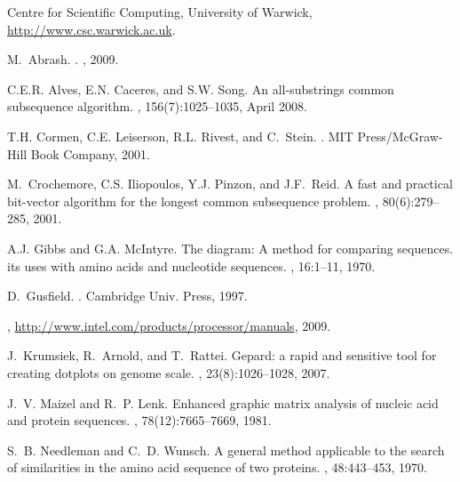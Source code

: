 \documentclass{IOS-Book-Article}     \usepackage{amsmath}
\theoremstyle{plain}
\theoremstyle{definition}
\begin{document}
{
\begin{thebibliography}{10}

{Centre for Scientific Computing, University of Warwick,
  \url{http://www.csc.warwick.ac.uk}}.

M.~Abrash.
.
, 2009.

C.E.R. Alves, E.N. Caceres, and S.W. Song.
\newblock An all-substrings common subsequence algorithm.
, 156(7):1025--1035, April 2008.

T.H. Cormen, C.E. Leiserson, R.L. Rivest, and C.~Stein.
.
\newblock MIT Press/McGraw-Hill Book Company, 2001.

M.~Crochemore, C.S. Iliopoulos, Y.J. Pinzon, and J.F.~Reid.
\newblock A fast and practical bit-vector algorithm for the longest common
  subsequence problem.
, 80(6):279--285, 2001.

A.J. Gibbs and G.A. McIntyre.
\newblock The diagram: {A} method for comparing sequences. its uses with amino
  acids and nucleotide sequences.
, 16:1--11, 1970.

D.~Gusfield.
.
\newblock Cambridge Univ. Press, 1997.

, 
\newblock \url{http://www.intel.com/products/processor/manuals}, 2009.

J.~Krumsiek, R.~Arnold, and T.~Rattei.
\newblock Gepard: a rapid and sensitive tool for creating dotplots on genome
  scale.
, 23(8):1026--1028, 2007.

J.~V. Maizel and R.~P. Lenk.
\newblock Enhanced graphic matrix analysis of nucleic acid and protein
  sequences.
, 78(12):7665--7669,
  1981.

S.~B. Needleman and C.~D. Wunsch.
\newblock A general method applicable to the search of similarities in the
  amino acid sequence of two proteins.
, 48:443--453, 1970.


\end{thebibliography}}
\end{document}
